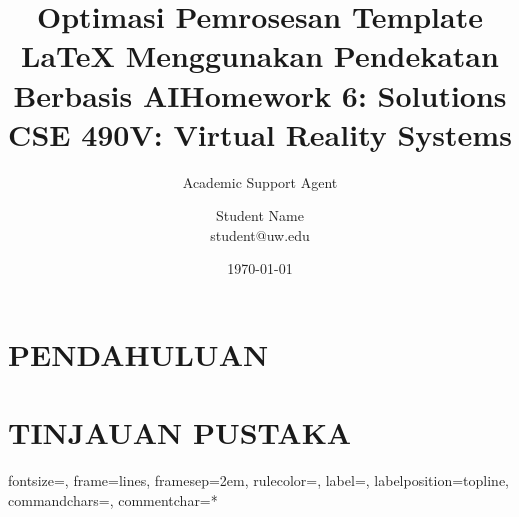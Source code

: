 \documentclass{styles/acmsiggraph}
\title{Optimasi Pemrosesan Template LaTeX Menggunakan Pendekatan Berbasis AI}
\author{Academic Support Agent}
\date{\today}
\begin{document}
\maketitle

\begin{abstract}

\end{abstract}

\chapter{PENDAHULUAN}


\chapter{TINJAUAN PUSTAKA}


\usepackage{comment} %
\usepackage{lipsum} %
\usepackage{fullpage} %
\usepackage{enumitem} %
\usepackage{amsmath,amsthm,amssymb}
\usepackage{listings}
\usepackage{graphicx}
\usepackage{etoolbox}   %
\usepackage{verbatim}   %
\usepackage[dvipsnames]{xcolor}
\usepackage{fancyvrb}
\usepackage{hyperref}
\usepackage{menukeys}
\usepackage{titlesec}
\setlength{\parskip}{.8mm}
\setcounter{MaxMatrixCols}{20}

\title{\huge Homework 6: Solutions \\ \LARGE {CSE 490V: Virtual Reality Systems}}
\author{\Large Student Name \\ student@uw.edu}


{}%
{fontsize=\footnotesize,
 frame=lines,  %
 framesep=2em, %
 rulecolor=\color{Gray},
 label=,
 labelposition=topline,
 commandchars=\|\(\), %
 commentchar=*        %
}

\titlespacing*{\subsection}{0pt}{3ex}{2ex}
\end{document}

